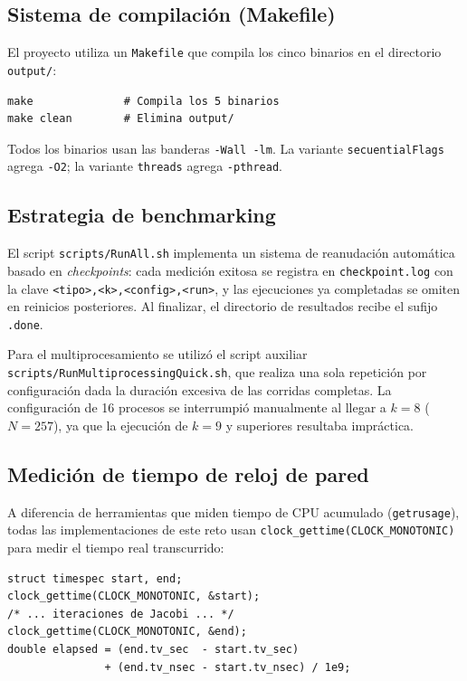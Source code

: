 \documentclass{article}
\begin{document}
\subsection{Sistema de compilación (Makefile)}

El proyecto utiliza un \texttt{Makefile} que compila los cinco binarios en el directorio \texttt{output/}:

\begin{verbatim}
make              # Compila los 5 binarios
make clean        # Elimina output/
\end{verbatim}

Todos los binarios usan las banderas \texttt{-Wall -lm}.  La variante
\texttt{secuentialFlags} agrega \texttt{-O2}; la variante \texttt{threads}
agrega \texttt{-pthread}.

\subsection{Estrategia de benchmarking}

El script \texttt{scripts/RunAll.sh} implementa un sistema de reanudación
automática basado en \emph{checkpoints}: cada medición exitosa se registra en
\texttt{checkpoint.log} con la clave \texttt{<tipo>,<k>,<config>,<run>}, y las
ejecuciones ya completadas se omiten en reinicios posteriores.  Al finalizar, el
directorio de resultados recibe el sufijo \texttt{.done}.

Para el multiprocesamiento se utilizó el script auxiliar
\texttt{scripts/RunMultiprocessingQuick.sh}, que realiza una sola repetición por
configuración dada la duración excesiva de las corridas completas.  La
configuración de 16 procesos se interrumpió manualmente al llegar a $k=8$ ($N=257$), ya que la ejecución de $k=9$ y superiores resultaba impráctica.

\subsection{Medición de tiempo de reloj de pared}

A diferencia de herramientas que miden tiempo de CPU acumulado
(\texttt{getrusage}), todas las implementaciones de este reto usan
\texttt{clock\_gettime(CLOCK\_MONOTONIC)} para medir el tiempo real transcurrido:

\begin{verbatim}
struct timespec start, end;
clock_gettime(CLOCK_MONOTONIC, &start);
/* ... iteraciones de Jacobi ... */
clock_gettime(CLOCK_MONOTONIC, &end);
double elapsed = (end.tv_sec  - start.tv_sec)
               + (end.tv_nsec - start.tv_nsec) / 1e9;
\end{verbatim}
\end{document}
